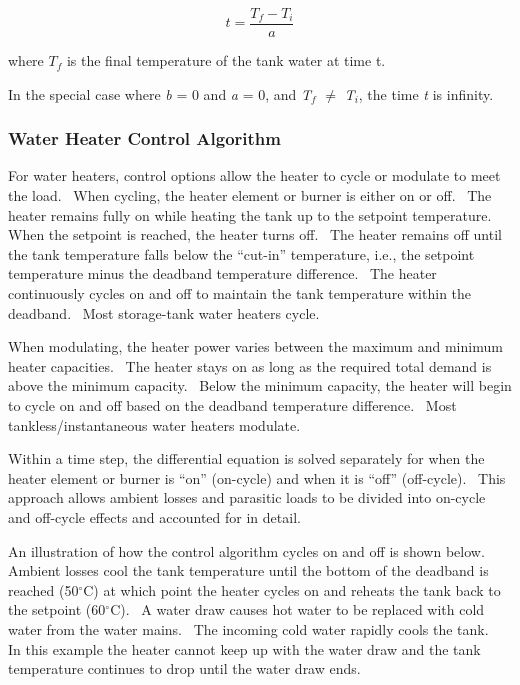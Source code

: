 \begin{equation}
t = \frac{{{T_f} - {T_i}}}{a}
\end{equation}

where \(T_{f}\) is the final temperature of the tank water at time t.

In the special case where \emph{b} = 0 and \emph{a} = 0, and \emph{T\(_{f}\)} \(\neq\) \emph{T\(_{i}\)}, the time \emph{t} is infinity.

\subsubsection{Water Heater Control Algorithm}\label{water-heater-control-algorithm}

For water heaters, control options allow the heater to cycle or modulate to meet the load.~ When cycling, the heater element or burner is either on or off.~ The heater remains fully on while heating the tank up to the setpoint temperature.~ When the setpoint is reached, the heater turns off.~ The heater remains off until the tank temperature falls below the ``cut-in'' temperature, i.e., the setpoint temperature minus the deadband temperature difference.~ The heater continuously cycles on and off to maintain the tank temperature within the deadband.~ Most storage-tank water heaters cycle.

When modulating, the heater power varies between the maximum and minimum heater capacities.~ The heater stays on as long as the required total demand is above the minimum capacity.~ Below the minimum capacity, the heater will begin to cycle on and off based on the deadband temperature difference.~ Most tankless/instantaneous water heaters modulate.

Within a time step, the differential equation is solved separately for when the heater element or burner is ``on'' (on-cycle) and when it is ``off'' (off-cycle).~ This approach allows ambient losses and parasitic loads to be divided into on-cycle and off-cycle effects and accounted for in detail.

An illustration of how the control algorithm cycles on and off is shown below.~ Ambient losses cool the tank temperature until the bottom of the deadband is reached (50\(^{\circ}\)C) at which point the heater cycles on and reheats the tank back to the setpoint (60\(^{\circ}\)C).~ A water draw causes hot water to be replaced with cold water from the water mains.~ The incoming cold water rapidly cools the tank.~ In this example the heater cannot keep up with the water draw and the tank temperature continues to drop until the water draw ends.


